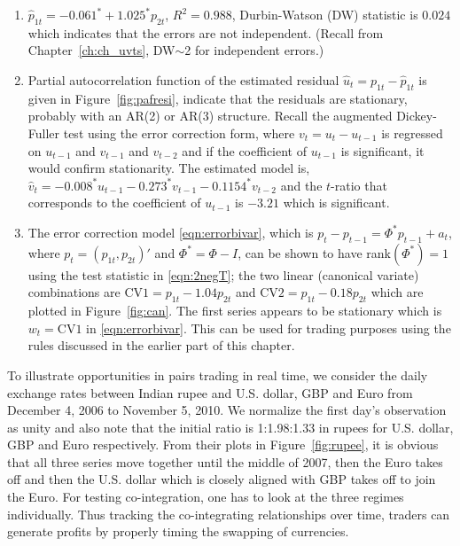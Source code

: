 \begin{enumerate}[--]
\item $\hat{p}_{1t}= -0.061^* + 1.025^* p_{2t}$, $R^2=0.988$, Durbin-Watson (DW) statistic is $0.024$ which indicates that the errors are not independent. (Recall from Chapter~\ref{ch:ch_uvts}, DW$\sim$2 for independent errors.)

\item Partial autocorrelation function of the estimated residual $\hat{u}_t= p_{1t} - \hat{p}_{1t}$ is given in Figure~\ref{fig:pafresi}, indicate that the residuals are stationary, probably with an AR(2) or AR(3) structure. Recall the augmented Dickey-Fuller test using the error correction form, where $v_t= u_t - u_{t-1}$ is regressed on $u_{t-1}$ and $v_{t-1}$ and $v_{t-2}$ and if the coefficient of $u_{t-1}$ is significant, it would confirm stationarity. The estimated model is, $\hat{v}_t= -0.008^* u_{t-1} - 0.273^* v_{t-1} - 0.1154^* v_{t-2}$ and the $t$-ratio that corresponds to the coefficient of $u_{t-1}$ is $-3.21$ which is significant. 

\item The error correction model \eqref{eqn:errorbivar}, which is $p_t - p_{t-1}= \Phi^* p_{t-1} + a_t$, where $p_t= (p_{1t}, p_{2t})'$ and $\Phi^* = \Phi-I$, can be shown to have rank$(\Phi^*)=1$ using the test statistic in \eqref{eqn:2negT}; the two linear (canonical variate) combinations are $\text{CV1}= p_{1t} - 1.04 p_{2t}$ and $\text{CV2}= p_{1t} - 0.18 p_{2t}$ which are plotted in Figure~\ref{fig:can}. The first series appears to be stationary which is $w_t= \text{CV1}$ in \eqref{eqn:errorbivar}. This can be used for trading purposes using the rules discussed in the earlier part of this chapter. 
\end{enumerate}


To illustrate opportunities in pairs trading in real time, we consider the daily exchange rates between Indian rupee and U.S. dollar, GBP and Euro from December 4, 2006 to November 5, 2010. We normalize the first day's observation as unity and also note that the initial ratio is 1:1.98:1.33 in rupees for U.S. dollar, GBP and Euro respectively. From their plots in Figure~\ref{fig:rupee}, it is obvious that all three series move together until the middle of 2007, then the Euro takes off and then the U.S. dollar which is closely aligned with GBP takes off to join the Euro. For testing co-integration, one has to look at the three regimes individually. Thus tracking the co-integrating relationships over time, traders can generate profits by properly timing the swapping of currencies.

